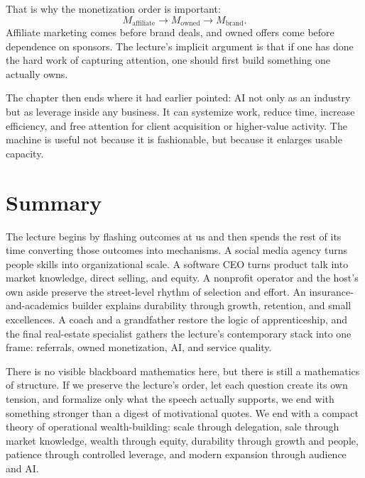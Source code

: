 That is why the monetization order is important:
\begin{equation}
M_{\text{affiliate}} \rightarrow M_{\text{owned}} \rightarrow M_{\text{brand}}.
\end{equation}
Affiliate marketing comes before brand deals, and owned offers come before dependence on sponsors. The lecture's implicit argument is that if one has done the hard work of capturing attention, one should first build something one actually owns.

The chapter then ends where it had earlier pointed: AI not only as an industry but as leverage inside any business. It can systemize work, reduce time, increase efficiency, and free attention for client acquisition or higher-value activity. The machine is useful not because it is fashionable, but because it enlarges usable capacity.

\section{Summary}

The lecture begins by flashing outcomes at us and then spends the rest of its time converting those outcomes into mechanisms. A social media agency turns people skills into organizational scale. A software CEO turns product talk into market knowledge, direct selling, and equity. A nonprofit operator and the host's own aside preserve the street-level rhythm of selection and effort. An insurance-and-academics builder explains durability through growth, retention, and small excellences. A coach and a grandfather restore the logic of apprenticeship, and the final real-estate specialist gathers the lecture's contemporary stack into one frame: referrals, owned monetization, AI, and service quality.

There is no visible blackboard mathematics here, but there is still a mathematics of structure. If we preserve the lecture's order, let each question create its own tension, and formalize only what the speech actually supports, we end with something stronger than a digest of motivational quotes. We end with a compact theory of operational wealth-building: scale through delegation, sale through market knowledge, wealth through equity, durability through growth and people, patience through controlled leverage, and modern expansion through audience and AI.